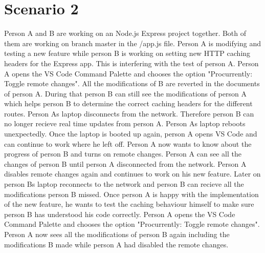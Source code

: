 \section{Scenario 2}
Person A and B are working on an Node.js Express project together. Both of them are working on branch master in the /app.js file.
Person A is modifying and testing a new feature while person B is working on setting new HTTP caching headers for the Express app.
This is interfering with the test of person A. Person A opens the VS Code Command Palette and chooses the option "Procurrently: Toggle remote changes".
All the modifications of B are reverted in the documents of person A.
During that person B can still see the modifications of person A which helps person B to determine the correct caching headers for the different routes.
Person As laptop disconnects from the network. Therefore person B can no longer recieve real time updates from person A.
Person As laptop reboots unexpectedly. Once the laptop is booted up again, person A opens VS Code and can continue to work where he left off.
Person A now wants to know about the progress of person B and turns on remote changes. Person A can see all the changes of person B until person A disconnected from the network. Person A disables remote changes again and continues to work on his new feature.
Later on person Bs laptop reconnects to the network and person B can recieve all the modifications person B missed.
Once person A is happy with the implementation of the new feature, he wants to test the caching behaviour himself to make sure person B has understood his code correctly.
Person A opens the VS Code Command Palette and chooses the option "Procurrently: Toggle remote changes".
Person A now sees all the modifications of person B again including the modifications B made while person A had disabled the remote changes.